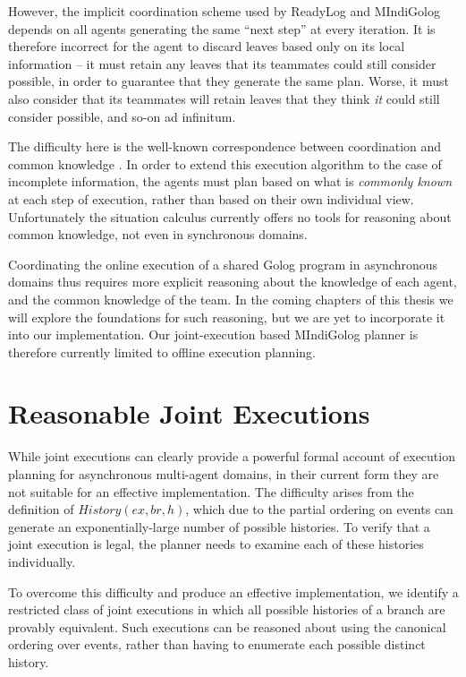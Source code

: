However, the implicit coordination scheme used by ReadyLog and MIndiGolog
depends on all agents generating the same {}``next step'' at every
iteration. It is therefore incorrect for the agent to discard leaves
based only on its local information -- it must retain any leaves that
its teammates could still consider possible, in order to guarantee
that they generate the same plan. Worse, it must also consider that
its teammates will retain leaves that they think \emph{it} could still
consider possible, and so-on ad infinitum.

The difficulty here is the well-known correspondence between coordination
and common knowledge \citep{halpern90knowledge_distrib}. In order
to extend this execution algorithm to the case of incomplete information,
the agents must plan based on what is \emph{commonly known} at each
step of execution, rather than based on their own individual view.
Unfortunately the situation calculus currently offers no tools for
reasoning about common knowledge, not even in synchronous domains.

Coordinating the online execution of a shared Golog program in asynchronous
domains thus requires more explicit reasoning about the knowledge
of each agent, and the common knowledge of the team. In the coming
chapters of this thesis we will explore the foundations for such reasoning,
but we are yet to incorporate it into our implementation. Our joint-execution
based MIndiGolog planner is therefore currently limited to offline
execution planning.


\section{Reasonable Joint Executions\label{sec:JointExec:Reasonable}}

While joint executions can clearly provide a powerful formal account
of execution planning for asynchronous multi-agent domains, in their
current form they are not suitable for an effective implementation.
The difficulty arises from the definition of $History(ex,br,h)$,
which due to the partial ordering on events can generate an exponentially-large
number of possible histories. To verify that a joint execution is
legal, the planner needs to examine each of these histories individually.

To overcome this difficulty and produce an effective implementation,
we identify a restricted class of joint executions in which all possible
histories of a branch are provably equivalent. Such executions can
be reasoned about using the canonical ordering over events, rather
than having to enumerate each possible distinct history.


